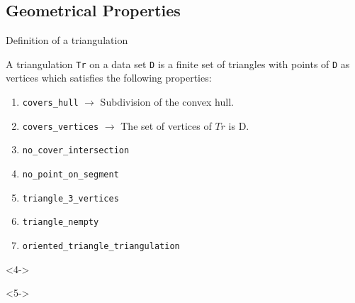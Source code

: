 \documentclass[18pt]{beamer}
\begin{document}
\subsection{Geometrical Properties}

\begin{frame}{Definition of a triangulation}

 A triangulation {\tt Tr} on a data set {\tt D} is a finite set of triangles with points of {\tt D} as vertices which satisfies the following properties:
\begin{enumerate}
\item<2-> {\tt covers\_hull}   \hspace{1.76cm} $\rightarrow$ Subdivision of the convex hull.
\item<3-> {\tt covers\_vertices}  \hspace{1cm} $\rightarrow$ The set of vertices of $Tr$ is D.
\item<4-> {\tt no\_cover\_intersection}
\item<4-> {\tt no\_point\_on\_segment \hspace{0.2 cm}}
\item<5-> {\tt triangle\_3\_vertices}
\item<5-> {\tt triangle\_nempty}
\item<5-> {\tt oriented\_triangle\_triangulation} 
\end{enumerate}

\begin{uncoverenv}<4->

\end{uncoverenv}

\begin{uncoverenv}<5->
\end{uncoverenv}

\end{frame}
\end{document}

